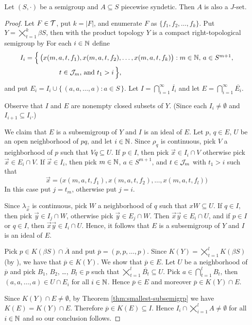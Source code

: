 \begin{thm}
  Let $(S, \cdot)$ be a semigroup and $A \subseteq S$ piecewise syndetic.
  Then $A$ is also a $J$-set.
\end{thm}
\begin{proof}
  Let $F \in \mathcal{T}$, put $k = |F|$, and enumerate $F$ as $\{f_1, f_2, \ldots, f_k\}$.
  Put $Y = \bigtimes_{t=1}^k \beta S$, then with the product topology $Y$ is a compact right-topological semigroup by \cite[Theorem 2.22]{Hindman:1998fk}
  For each $i \in \mathbb{N}$ define
  \begin{align*}
    I_i &= \Bigl\{\, \bigl( x(m, a, t, f_1), x(m, a, t, f_2), \ldots,
    x(m, a, t, f_k) \bigr) : \mbox{$m \in \mathbb{N}$, $a \in S^{m+1}$,} \\
    &\hspace{5em} \mbox{$t \in \mathcal{J}_m$, and $t_1 > i$}
    \,\Bigr\},
  \end{align*}
  and put $E_i = I_i \cup \{\, (a, a, \ldots, a) : a \in S \,\}$.
  Let $I = \bigcap_{i=1}^\infty \overline{I_i}$ and let $E = \bigcap_{i=1}^\infty \overline{E_i}$.

  Observe that $I$ and $E$ are nonempty closed subsets of $Y$.
  (Since each $I_i \ne \emptyset$ and $I_{i+1} \subseteq I_i$.)

  We claim that $E$ is a subsemigroup of $Y$ and $I$ is an ideal of $E$.
  Let $p$, $q \in E$, $U$ be an open neighborhood of $pq$, and let $i \in \mathbb{N}$. 
  Since $\rho_q$ is continuous, pick $V$ a neighborhood of $p$ such that $Vq \subseteq U$. 
  If $p \in I$, then pick $\vec{x} \in I_i \cap V$ otherwise pick $\vec{x} \in E_i \cap V$.
  If $\vec{x} \in I_i$, then pick $m \in \mathbb{N}$, $a \in S^{m+1}$, and $t \in \mathcal{J}_m$ with $t_1 > i$ such that
  \[
    \vec{x} = \bigl( x(m, a, t, f_1), x(m, a, t, f_2), \ldots, x(m,
    a, t, f_l) \bigr)
  \]
  In this case put $j = t_m$, otherwise put $j=i$. 

  Since $\lambda_{\vec{x}}$ is continuous, pick $W$ a neighborhood of $q$ such that $xW \subseteq U$. 
  If $q \in I$, then pick $\vec{y} \in I_j \cap W$, otherwise pick $\vec{y} \in E_j \cap W$.
  Then $\vec{x} \vec{y} \in E_i \cap U$, and if $p \in I$ or $q \in I$, then $\vec{x} \vec{y} \in I_i \cap U$. 
  Hence, it follows that $E$ is a subsemigroup of $Y$ and $I$ is an ideal of $E$.

  Pick $p \in K(\beta S) \cap \overline{A}$ and put $\overline{p} = (p, p, \ldots, p)$. 
  Since $K(Y) = \bigtimes_{t=1}^l K(\beta S)$ (by \cite[Theorem 2.23]{Hindman:1998fk}), we have that $\overline{p} \in K(Y)$. 
  We show that $\overline{p} \in E$.
  Let $U$ be a neighborhood of $\overline{p}$ and pick $B_1$, $B_2$, \dots, $B_l \in p$ such that $\bigtimes_{t=1}^l \overline{B_t} \subseteq U$. 
  Pick $a \in \bigcap_{t=1}^l B_t$, then $(a, a, \ldots, a) \in U \cap E_i$ for all $i \in \mathbb{N}$. 
  Hence $\overline{p} \in E$ and moreover $\overline{p} \in K(Y) \cap E$.

  Since $K(Y) \cap E \ne \emptyset$, by Theorem \ref{thm:smallest-subsemigrp} we have $K(E) = K(Y) \cap E$.
  Therefore $\overline{p} \in K(E) \subseteq I$.
  Hence $I_i \cap \bigtimes_{i=1}^l A \ne \emptyset$ for all $i \in \mathbb{N}$ and so our conclusion follows.
\end{proof}

